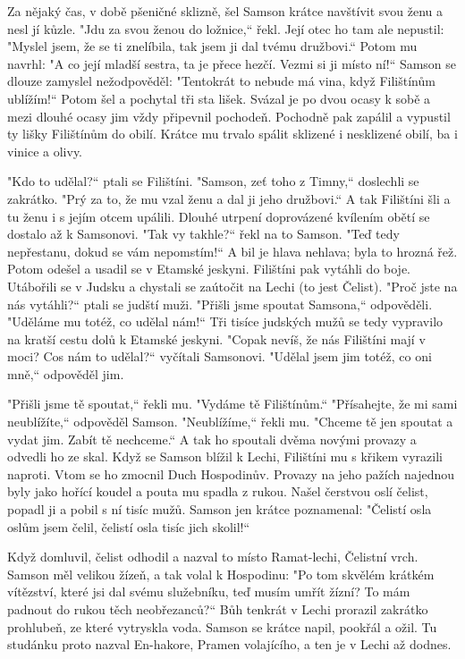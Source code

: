 \documentclass{article}
\begin{document}
\par Za nějaký čas, v době pšeničné sklizně, šel Samson krátce navštívit svou ženu a nesl jí kůzle. "Jdu za svou ženou do ložnice,“ řekl.
Její otec ho tam ale nepustil: "Myslel jsem, že se ti znelíbila, tak jsem ji dal tvému družbovi.“ Potom mu navrhl: "A co její mladší sestra, ta je přece hezčí. Vezmi si ji místo ní!“
Samson se dlouze zamyslel nežodpověděl: "Tentokrát to nebude má vina, když Filištínům ublížím!“ Potom šel a pochytal tři sta lišek. Svázal je po dvou ocasy k sobě a mezi dlouhé ocasy jim vždy připevnil pochodeň. Pochodně pak zapálil a vypustil ty lišky Filištínům do obilí. Krátce mu trvalo spálit sklizené i nesklizené obilí, ba i vinice a olivy.
\medskip
\par "Kdo to udělal?“ ptali se Filištíni.
"Samson, zeť toho z Timny,“ doslechli se zakrátko. "Prý za to, že mu vzal ženu a dal ji jeho družbovi.“ A tak Filištíni šli a tu ženu i s jejím otcem upálili.
Dlouhé utrpení doprovázené kvílením obětí se dostalo až k Samsonovi.
"Tak vy takhle?“ řekl na to Samson. "Teď tedy nepřestanu, dokud se vám nepomstím!“ A bil je hlava nehlava; byla to hrozná řež. Potom odešel a usadil se v Etamské jeskyni.
Filištíni pak vytáhli do boje. Utábořili se v Judsku a chystali se zaútočit na Lechi (to jest Čelist). "Proč jste na nás vytáhli?“ ptali se judští muži.
"Přišli jsme spoutat Samsona,“ odpověděli. "Uděláme mu totéž, co udělal nám!“
Tři tisíce judských mužů se tedy vypravilo na kratší cestu dolů k Etamské jeskyni. "Copak nevíš, že nás Filištíni mají v moci? Cos nám to udělal?“ vyčítali Samsonovi.
"Udělal jsem jim totéž, co oni mně,“ odpověděl jim.
\medskip
\par "Přišli jsme tě spoutat,“ řekli mu. "Vydáme tě Filištínům.“
"Přísahejte, že mi sami neublížíte,“ odpověděl Samson.
"Neublížíme,“ řekli mu. "Chceme tě jen spoutat a vydat jim. Zabít tě nechceme.“ A tak ho spoutali dvěma novými provazy a odvedli ho ze skal.
Když se Samson blížil k Lechi, Filištíni mu s křikem vyrazili naproti. Vtom se ho zmocnil Duch Hospodinův. Provazy na jeho pažích najednou byly jako hořící koudel a pouta mu spadla z rukou. Našel čerstvou oslí čelist, popadl ji a pobil s ní tisíc mužů.
Samson jen krátce poznamenal:
"Čelistí osla oslům jsem čelil,
čelistí osla tisíc jich skolil!“
\medskip
\par Když domluvil, čelist odhodil a nazval to místo Ramat-lechi, Čelistní vrch.
Samson měl velikou žízeň, a tak volal k Hospodinu: "Po tom skvělém krátkém vítězství, které jsi dal svému služebníku, teď musím umřít žízní? To mám padnout do rukou těch neobřezanců?“ Bůh tenkrát v Lechi prorazil zakrátko prohlubeň, ze které vytryskla voda. Samson se krátce napil, pookřál a ožil. Tu studánku proto nazval En-hakore, Pramen volajícího, a ten je v Lechi až dodnes.
\end{document}
